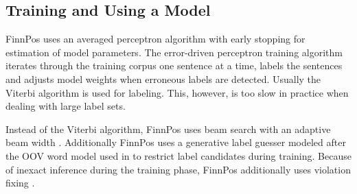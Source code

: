 \documentclass{llncs}
\begin{document}
%
%

\subsection{Training and Using a Model}

FinnPos uses an averaged perceptron algorithm with early stopping for
estimation of model parameters. The error-driven perceptron training
algorithm iterates through the training corpus one sentence at a time,
labels the sentences and adjusts model weights when erroneous labels
are detected. Usually the Viterbi algorithm \cite{collins/2002} is
used for labeling. This, however, is too slow in practice when dealing
with large label sets.

Instead of the Viterbi algorithm, FinnPos uses beam search with
an adaptive beam width \cite{pal/2006}. Additionally FinnPos uses a generative
label guesser modeled after the OOV word model used in
\cite{brants/2000} to restrict label candidates during
training. Because of inexact inference during the training phase,
FinnPos additionally uses violation fixing \cite{huang/2012}.
\end{document}
